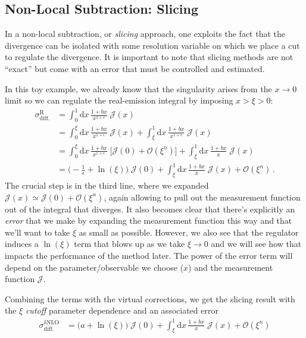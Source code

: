 \documentclass[11pt]{article}
\begin{document}
\subsection{Non-Local Subtraction: Slicing}
\label{sec:orgd9747ed}
In a non-local subtraction, or \emph{slicing} approach, one exploits the fact that the divergence can be isolated with some resolution variable on which we place a cut to regulate the divergence.
It is important to note that slicing methods are not ``exact'' but come with an error that must be controlled and estimated.

In this toy example, we already know that the singularity arises from the \(x\to0\) limit so we can regulate the real-emission integral by imposing \(x > \xi > 0\):
\begin{align}
  \sigma^\mathrm{R}_\mathrm{diff.}
  &=
  \int_0^1\mathrm{d}x\,\frac{1+bx}{x^{1+\epsilon}}
  \;\mathcal{J}(x)
  \nonumber\\&=
  \int_0^\xi\mathrm{d}x\,\frac{1+bx}{x^{1+\epsilon}}
  \;\mathcal{J}(x) +
  \int_\xi^1\mathrm{d}x\,\frac{1+bx}{x^{1+\epsilon}}
  \;\mathcal{J}(x)
  \nonumber\\&=
  \int_0^\xi\mathrm{d}x\,\frac{1+bx}{x^{1+\epsilon}}
  \;\Big[\mathcal{J}(0) + \mathcal{O}(\xi^n)\Bigr]
  +\int_\xi^1\mathrm{d}x\,\frac{1+bx}{x}
  \;\mathcal{J}(x)
  \nonumber\\&=
  \biggl( -\frac{1}{\epsilon} + \ln(\xi) \biggr) \;\mathcal{J}(0)
  +\int_\xi^1\mathrm{d}x\,\frac{1+bx}{x}
  \;\mathcal{J}(x)
  + \mathcal{O}(\xi^n)
  \,.
\end{align}
The crucial step is in the third line, where we expanded \(\mathcal{J}(x) \simeq \mathcal{J}(0) + \mathcal{O}(\xi^n)\), again allowing to pull out the measurement function out of the integral that diverges.
It also becomes clear that there's explicitly an \emph{error} that we make by expanding the measurement function this way and that we'll want to take \(\xi\) as small as possible.
However, we also see that the regulator induces a \(\ln(\xi)\) term that blows up as we take \(\xi\to0\) and we will see how that impacts the performance of the method later.
The power of the error term will depend on the parameter/observable we choose (\(x\)) and the measurement function \(\mathcal{J}\).

Combining the terms with the virtual corrections, we get the slicing result with the \(\xi\) \emph{cutoff} parameter
dependence and an associated error
\begin{align}
\label{eq:slice}
  \sigma^\mathrm{\delta NLO}_\mathrm{diff.}
  &=
  \bigl(a + \ln(\xi)\bigr) \;\mathcal{J}(0)
  +\int_\xi^1\mathrm{d}x\,\frac{1+bx}{x}
  \;\mathcal{J}(x)
  + \mathcal{O}(\xi^n)
\end{align}
\end{document}
